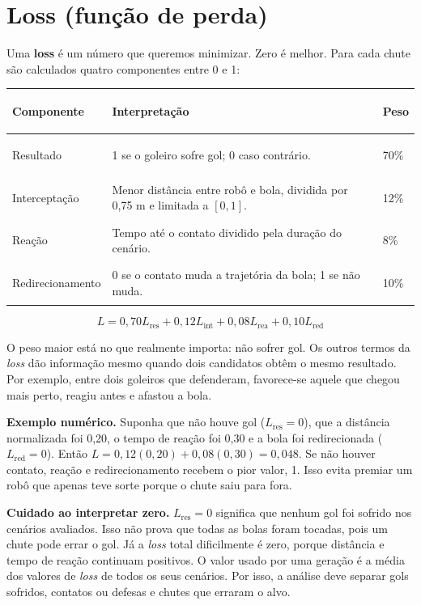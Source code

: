 \documentclass[11pt,a4paper]{article}
\newcommand{\termo}[1]{\textbf{\color{azulescuro}#1}}
\begin{document}
\section{Loss (função de perda)}

Uma \termo{loss} é um número que queremos minimizar. Zero é melhor. Para cada
chute são calculados quatro componentes entre 0 e 1:

\begin{tabularx}{\linewidth}{>{\bfseries\raggedright\arraybackslash}p{3.6cm} X p{1.3cm}}
\toprule
Componente & Interpretação & Peso \\
\midrule
Resultado & 1 se o goleiro sofre gol; 0 caso contrário. & 70\% \\
Interceptação & Menor distância entre robô e bola, dividida por 0,75 m e limitada a $[0,1]$. & 12\% \\
Reação & Tempo até o contato dividido pela duração do cenário. & 8\% \\
Redirecionamento & 0 se o contato muda a trajetória da bola; 1 se não muda. & 10\% \\
\bottomrule
\end{tabularx}

\[
\boxed{L=0{,}70L_{\mathrm{res}}+0{,}12L_{\mathrm{int}}
+0{,}08L_{\mathrm{rea}}+0{,}10L_{\mathrm{red}}}
\]

O peso maior está no que realmente importa: não sofrer gol. Os outros termos da
\emph{loss}
dão informação mesmo quando dois candidatos obtêm o mesmo resultado. Por
exemplo, entre dois goleiros que defenderam, favorece-se aquele que chegou mais
perto, reagiu antes e afastou a bola.

\textbf{Exemplo numérico.} Suponha que não houve gol
($L_{\mathrm{res}}=0$), que a distância normalizada foi 0,20, o tempo de reação
foi 0,30 e a bola foi redirecionada ($L_{\mathrm{red}}=0$). Então
$L=0{,}12(0{,}20)+0{,}08(0{,}30)=0{,}048$. Se não houver contato, reação e
redirecionamento recebem o pior valor, 1. Isso evita premiar um robô que apenas
teve sorte porque o chute saiu para fora.

\textbf{Cuidado ao interpretar zero.} $L_{\mathrm{res}}=0$ significa que
nenhum gol foi sofrido nos cenários avaliados. Isso não prova que todas as bolas
foram tocadas, pois um chute pode errar o gol. Já a \emph{loss} total dificilmente é
zero, porque distância e tempo de reação continuam positivos. O valor usado por
uma geração é a média dos valores de \emph{loss} de todos os seus cenários. Por isso, a análise
deve separar gols sofridos, contatos ou defesas e chutes que erraram o alvo.
\end{document}
